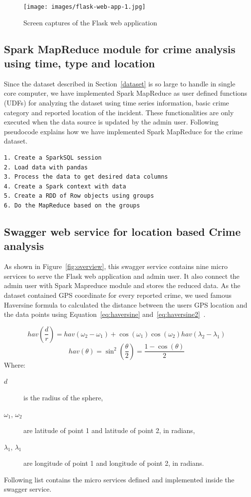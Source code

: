 \begin{figure}[htb]
	\centering\texttt{[image: images/flask-web-app-1.jpg]}
	\caption{Screen captures of the Flask web application}\label{fig:screencapture}
\end{figure}

\subsection{Spark MapReduce module for crime analysis using time, type and location}\label{sparkModule}
Since the dataset described in Section~\ref{dataset} is so large to
handle in single core computer, we have implemented Spark MapReduce as
user defined functions (UDFs) for analyzing the dataset using time
series information, basic crime category and reported location of the
incident. These functionalities are only executed when the data source
is updated by the admin user. Following pseudocode explains how we
have implemented Spark MapReduce for the crime dataset.

\begin{verbatim}
1. Create a SparkSQL session
2. Load data with pandas
3. Process the data to get desired data columns
4. Create a Spark context with data
5. Create a RDD of Row objects using groups
6. Do the MapReduce based on the groups
\end{verbatim}

\subsection{Swagger web service for location based Crime analysis}\label{swaggerService}
As shown in Figure~\ref{fig:overview}, this swagger service contains
nine micro services to serve the Flask web application and admin
user. It also connect the admin user with Spark Mapreduce module and
stores the reduced data. As the dataset contained GPS coordinate for
every reported crime, we used famous Haversine formula to calculated
the distance between the users GPS location and the data points using
Equation~\ref{eq:haversine}
and~\ref{eq:haversine2}~\cite{hid-sp18-409-siahaan2017haversine}.

\begin{equation}\label{eq:haversine}
hav(\frac{d}{r}) = hav(\omega_2 - \omega_1) + \cos(\omega_1)\cos(\omega_2)hav(\lambda_2 - \lambda_1)
\end{equation}
\begin{equation}\label{eq:haversine2}
hav(\theta) = \sin^2(\frac{\theta}{2}) = \frac{1-\cos(\theta)}{2}
\end{equation}
Where:
\begin{description}
\item[$d$] is the radius of the sphere,
\item[$\omega_1$, $\omega_2$] are latitude of point 1 and latitude of point 2, in radians,
\item[$\lambda_1$, $\lambda_1$] are longitude of point 1 and longitude of point 2, in radians.
\end{description}
Following list contains the micro services defined and implemented inside the swagger service.


